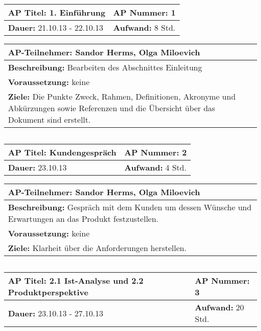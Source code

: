 \begin{tabular}{|p{7.43cm}|p{7.43cm}|}
\hline
\textbf{AP Titel: }1. Einführung & \textbf{AP Nummer: }1 \\ 
\hline
\textbf{Dauer: }21.10.13 - 22.10.13 & \textbf{Aufwand: }8 Std.\\
\hline
\end{tabular}
\begin{tabular}{|p{15.3cm}|}
\hline
\textbf{AP-Teilnehmer: }Sandor Herms, Olga Miloevich\\
\hline
\textbf{Beschreibung: }Bearbeiten des Abschnittes Einleitung\\
\hline
\textbf{Voraussetzung: }keine\\
\hline 
\textbf{Ziele: }Die Punkte Zweck, Rahmen, Definitionen, Akronyme und Abkürzungen sowie Referenzen und die Übersicht über das Dokument sind erstellt.\\
\hline 
\end{tabular}
\begin{verbatim}

\end{verbatim}
\begin{tabular}{|p{7.43cm}|p{7.43cm}|}
\hline
\textbf{AP Titel: }Kundengespräch & \textbf{AP Nummer: 2} \\ 
\hline
\textbf{Dauer: }23.10.13 & \textbf{Aufwand: }4 Std.\\
\hline
\end{tabular}
\begin{tabular}{|p{15.3cm}|}
\hline
\textbf{AP-Teilnehmer: }Sandor Herms, Olga Miloevich\\
\hline
\textbf{Beschreibung: }Gespräch mit dem Kunden um dessen Wünsche und Erwartungen an das Produkt festzustellen.\\
\hline
\textbf{Voraussetzung: }keine\\
\hline 
\textbf{Ziele: }Klarheit über die Anforderungen herstellen.\\
\hline 
\end{tabular}
\begin{verbatim}

\end{verbatim}
\begin{tabular}{|p{7.43cm}|p{7.43cm}|}
\hline
\textbf{AP Titel: }2.1 Ist-Analyse und 2.2 Produktperspektive & \textbf{AP Nummer: }3 \\ 
\hline
\textbf{Dauer: }23.10.13 - 27.10.13 & \textbf{Aufwand: }20 Std.\\
\hline
\end{tabular}
